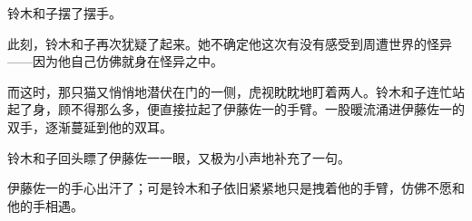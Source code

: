 铃木和子摆了摆手。



此刻，铃木和子再次犹疑了起来。她不确定他这次有没有感受到周遭世界的怪异——因为他自己仿佛就身在怪异之中。

而这时，那只猫又悄悄地潜伏在门的一侧，虎视眈眈地盯着两人。铃木和子连忙站起了身，顾不得那么多，便直接拉起了伊藤佐一的手臂。一股暖流涌进伊藤佐一的双手，逐渐蔓延到他的双耳。

铃木和子回头瞟了伊藤佐一一眼，又极为小声地补充了一句。


伊藤佐一的手心出汗了；可是铃木和子依旧紧紧地只是拽着他的手臂，仿佛不愿和他的手相遇。



